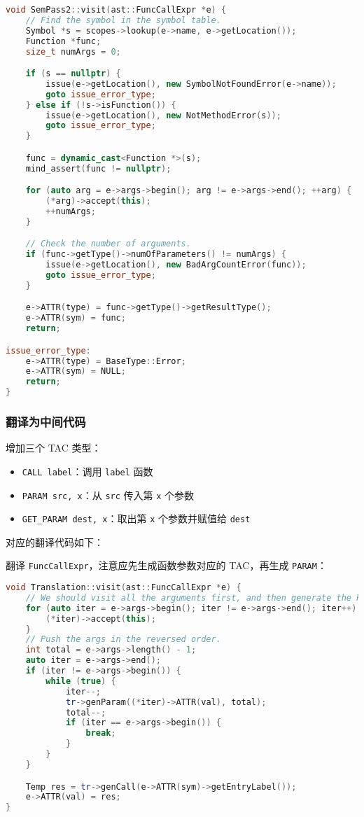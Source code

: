 \documentclass[a4paper]{article}
\begin{document}
\begin{lstlisting}[language=c++]
void SemPass2::visit(ast::FuncCallExpr *e) {
    // Find the symbol in the symbol table.
    Symbol *s = scopes->lookup(e->name, e->getLocation());
    Function *func;
    size_t numArgs = 0;

    if (s == nullptr) {
        issue(e->getLocation(), new SymbolNotFoundError(e->name));
        goto issue_error_type;
    } else if (!s->isFunction()) {
        issue(e->getLocation(), new NotMethodError(s));
        goto issue_error_type;
    }

    func = dynamic_cast<Function *>(s);
    mind_assert(func != nullptr);

    for (auto arg = e->args->begin(); arg != e->args->end(); ++arg) {
        (*arg)->accept(this);
        ++numArgs;
    }

    // Check the number of arguments.
    if (func->getType()->numOfParameters() != numArgs) {
        issue(e->getLocation(), new BadArgCountError(func));
        goto issue_error_type;
    }

    e->ATTR(type) = func->getType()->getResultType();
    e->ATTR(sym) = func;
    return;

issue_error_type:
    e->ATTR(type) = BaseType::Error;
    e->ATTR(sym) = NULL;
    return;
}
\end{lstlisting}

\subsubsection{翻译为中间代码}

增加三个 TAC 类型：

\begin{itemize}
    \item \texttt{CALL label}：调用 \texttt{label} 函数
    \item \texttt{PARAM src, x}：从 \texttt{src} 传入第 \texttt{x} 个参数
    \item \texttt{GET\_PARAM dest, x}：取出第 \texttt{x} 个参数并赋值给 \texttt{dest}
\end{itemize}

对应的翻译代码如下：

翻译 \texttt{FuncCallExpr}，注意应先生成函数参数对应的 TAC，再生成 \texttt{PARAM}：

\begin{lstlisting}[language=c++]
void Translation::visit(ast::FuncCallExpr *e) {
    // We should visit all the arguments first, and then generate the PARAM tac.
    for (auto iter = e->args->begin(); iter != e->args->end(); iter++) {
        (*iter)->accept(this);
    }
    // Push the args in the reversed order.
    int total = e->args->length() - 1;
    auto iter = e->args->end();
    if (iter != e->args->begin()) {
        while (true) {
            iter--;
            tr->genParam((*iter)->ATTR(val), total);
            total--;
            if (iter == e->args->begin()) {
                break;
            }
        }
    }

    Temp res = tr->genCall(e->ATTR(sym)->getEntryLabel());
    e->ATTR(val) = res;
}
\end{lstlisting}
\end{document}
